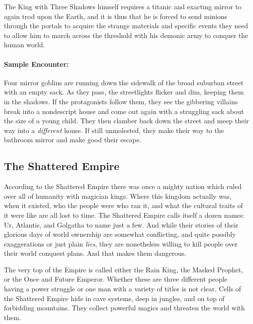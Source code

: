 The King with Three Shadows himself requires a titanic and exacting mirror to again trod upon the Earth, and it is thus that he is forced to send minions through the portals to acquire the strange materials and specific events they need to allow him to march across the threshold with his demonic army to conquer the human world.

\paragraph{Sample Encounter:} Four mirror goblins are running down the sidewalk of the broad suburban street with an empty sack. As they pass, the streetlights flicker and dim, keeping them in the shadows. If the protagonists follow them, they see the gibbering villains break into a nondescript house and come out again with a struggling sack about the size of a young child. They then clamber back down the street and meep their way into a \textit{different} house. If still unmolested, they make their way to the bathroom mirror and make good their escape.

\subsection{The Shattered Empire} 

According to the Shattered Empire there was once a mighty nation which ruled over all of humanity with magician kings. Where this kingdom actually was, when it existed, who the people were who ran it, and what the cultural traits of it were like are all lost to time. The Shattered Empire calls itself a dozen names: Ur, Atlantis, and Golgatha to name just a few. And while their stories of their glorious days of world ownership are somewhat conflicting, and quite possibly exaggerations or just plain \textit{lies}, they are nonetheless willing to kill people over their world conquest plans. And that makes them dangerous.

The very top of the Empire is called either the Rain King, the Masked Prophet, or the Once and Future Emperor. Whether these are three different people having a power struggle or one man with a variety of titles is not clear. Cells of the Shattered Empire hide in cave systems, deep in jungles, and on top of forbidding mountains. They collect powerful magics and threaten the world with them.

